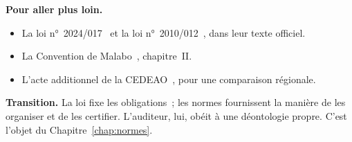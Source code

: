 \bigskip

\begin{boxinfo}
\textbf{Pour aller plus loin.}
\begin{itemize}
    \item La loi n°~2024/017~\cite{loi2024017} et la loi
          n°~2010/012~\cite{loi2010012}, dans leur texte officiel.
    \item La Convention de Malabo~\cite{ua2014malabo}, chapitre~II.
    \item L'acte additionnel de la CEDEAO~\cite{cedeao2010acte}, pour une
          comparaison régionale.
\end{itemize}
\end{boxinfo}

\begin{boxinfo}
\textbf{Transition.} La loi fixe les obligations~; les normes fournissent la
manière de les organiser et de les certifier. L'auditeur, lui, obéit à une
déontologie propre. C'est l'objet du Chapitre~\ref{chap:normes}.
\end{boxinfo}
